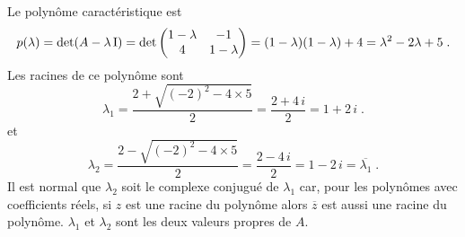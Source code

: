 {\begin{egg}
Le polynôme caractéristique est 
\[
p(\lambda) = \det(A - \lambda \operatorname{I}) = \det
\begin{pmatrix}
1-\lambda & -1 \\ 4 & 1-\lambda  
\end{pmatrix}
= (1-\lambda)(1-\lambda) + 4 = \lambda^2 - 2 \lambda + 5 \; .
\]
Les racines de ce polynôme sont
\[
\lambda_1 = \frac{2 + \sqrt{(-2)^2 - 4 \times 5}}{2}
= \frac{2 + 4\,i}{2} = 1 +2\,i \; .
\]
et
\[
\lambda_2 = \frac{2 - \sqrt{(-2)^2 - 4 \times 5}}{2}
= \frac{2 - 4\,i}{2} = 1  - 2\,i = \overline{\lambda_1} \; .
\]
Il est normal que $\lambda_2$ soit le complexe conjugué de $\lambda_1$
car, pour les polynômes avec coefficients réels, si $z$ est une racine
du polynôme alors $\overline{z}$ est aussi une racine du polynôme.
$\lambda_1$ et $\lambda_2$ sont les deux valeurs propres de $A$.


\end{egg}}
